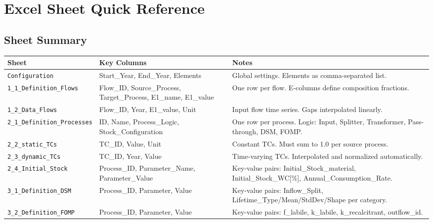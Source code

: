 \chapter{Excel Sheet Quick Reference}
\label{ch:excel-ref}

\section{Sheet Summary}

\begin{longtable}{L{3.5cm}L{3cm}L{6.5cm}}
\toprule
\textbf{Sheet} & \textbf{Key Columns} & \textbf{Notes} \\
\midrule
\endhead

\texttt{Configuration} &
Start\_Year, End\_Year, Elements &
Global settings. Elements as comma-separated list. \\
\midrule

\texttt{1\_1\_Definition\_Flows} &
Flow\_ID, Source\_Process, Target\_Process, E1\_name, E1\_value &
One row per flow. E-columns define composition fractions. \\
\midrule

\texttt{1\_2\_Data\_Flows} &
Flow\_ID, Year, E1\_value, Unit &
Input flow time series. Gaps interpolated linearly. \\
\midrule

\texttt{2\_1\_Definition\_Processes} &
ID, Name, Process\_Logic, Stock\_Configuration &
One row per process. Logic: Input, Splitter, Transformer, Pass-through, DSM, FOMP. \\
\midrule

\texttt{2\_2\_static\_TCs} &
TC\_ID, Value, Unit &
Constant TCs. Must sum to 1.0 per source process. \\
\midrule

\texttt{2\_3\_dynamic\_TCs} &
TC\_ID, Year, Value &
Time-varying TCs. Interpolated and normalized automatically. \\
\midrule

\texttt{2\_4\_Initial\_Stock} &
Process\_ID, Parameter\_Name, Parameter\_Value &
Key-value pairs: Initial\_Stock\_material, Initial\_Stock\_WC[\%], Annual\_Consumption\_Rate. \\
\midrule

\texttt{3\_1\_Definition\_DSM} &
Process\_ID, Parameter, Value &
Key-value pairs: Inflow\_Split, Lifetime\_Type/Mean/StdDev/Shape per category. \\
\midrule

\texttt{3\_2\_Definition\_FOMP} &
Process\_ID, Parameter, Value &
Key-value pairs: f\_labile, k\_labile, k\_recalcitrant, outflow\_id. \\
\midrule


\end{longtable}
